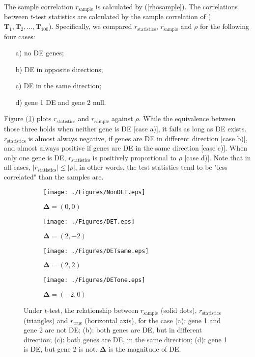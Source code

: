 \documentclass[12pt, a4paper]{article}
\begin{document}
	The sample correlation $r_{\text{sample}}$ is calculated by (\ref{rhosample}). The correlations
	between $t$-test statistics are calculated by the sample correlation of ($\bm T_1, \bm T_2, \ldots,
	\bm T_{100}$). Specifically, we compared $r_\text{statistics}$, $r_{\text{sample}}$ and $\rho$ for
	the following four cases:
	\begin{enumerate}
		\item[a)] no DE genes;
		\item[b)]  DE in opposite directions;
		\item[c)] DE in the same direction; 
		\item[d)] gene 1 DE and gene 2 null.
	\end{enumerate}
	Figure (\ref{figureT}) plots $r_\text{statistics}$ and $r_{\text{sample}}$ against $\rho$. While the
	equivalence between those three holds when neither gene is DE [case a)], it fails as long as DE
	exists. $r_\text{statistics}$ is almost always negative, if genes are DE in different direction
	[case b)], and almost always positive if genes are DE in the same direction [case c)]. When only one
	gene is DE,  $r_\text{statistics}$ is positively proportional to $\rho$ [case d)]. Note that in all
	cases, $|r_{\text{statistics}}| \leq |\rho|$, in other words, the test statistics tend to be "less
	correlated" than the samples are.
	
	\begin{figure}[!ht]
		\centering
		\begin{subfigure}{.5\textwidth}
			\centering
			\texttt{[image: ./Figures/NonDET.eps]}
			\captionsetup{justification=centering}
			\caption{$\bm \Delta= (0, 0)$}
		\end{subfigure}%
		\begin{subfigure}{.5\textwidth}
			\centering
			\texttt{[image: ./Figures/DET.eps]}
			\captionsetup{justification=centering}
			\caption{$\bm \Delta= (2, -2)$}
		\end{subfigure}
		\newline
		\newline
		\centering
		\begin{subfigure}{.5\textwidth}
			\centering
			\texttt{[image: ./Figures/DETsame.eps]}
			\captionsetup{justification=centering}
			\caption{$\bm \Delta= (2, 2)$}
		\end{subfigure}%
		\begin{subfigure}{.5\textwidth}
			\centering
			\texttt{[image: ./Figures/DETone.eps]}
			\captionsetup{justification=centering}
			\caption{$\bm \Delta= (-2, 0)$ }
		\end{subfigure}
		\caption{Under $t$-test, the relationship between $r_{\text{sample}}$ (solid dots), $
			r_\text{statistics}$ (triangles) and $r_{\text{true}}$ (horizontal axis), for the case (a): gene 1
			and gene 2 are not DE; (b): both genes are DE, but in different direction; (c): both genes are DE,
			in the same direction; (d): gene 1 is DE, but gene 2 is not. $\bm \Delta$ is the magnitude of DE.}
		\label{figureT}
	\end{figure}
	
\end{document}
